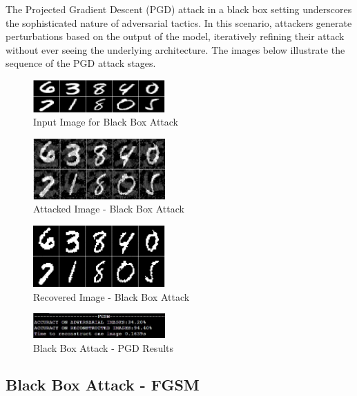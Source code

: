 \documentclass[letterpaper,twocolumn,10pt]{article}
\begin{document}
The Projected Gradient Descent (PGD) attack in a black box setting underscores the sophisticated nature of adversarial tactics. In this scenario, attackers generate perturbations based on the output of the model, iteratively refining their attack without ever seeing the underlying architecture. The images below illustrate the sequence of the PGD attack stages.

\begin{figure}[htbp]
  \centering
  \includegraphics[width=0.45\textwidth]{g.png}
  \caption{Input Image for Black Box Attack}
  \label{fig:g}
\end{figure}

\begin{figure}[htbp]
  \centering
  \includegraphics[width=0.45\textwidth]{h.png}
  \caption{Attacked Image - Black Box Attack}
  \label{fig:h}
\end{figure}

\begin{figure}[htbp]
  \centering
  \includegraphics[width=0.45\textwidth]{i.png}
  \caption{Recovered Image - Black Box Attack}
  \label{fig:i}
\end{figure}

\begin{figure}[htbp]
  \centering
  \includegraphics[width=0.45\textwidth]{bfgsm.png}
  \caption{Black Box Attack - PGD Results}
  \label{fig:bfgsm}
\end{figure}

\subsection{Black Box Attack - FGSM}
\end{document}
